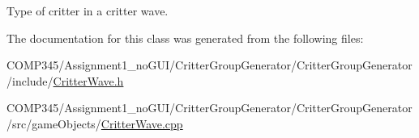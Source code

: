 Type of critter in a critter wave. 



The documentation for this class was generated from the following files\+:\begin{DoxyCompactItemize}
\item 
C\+O\+M\+P345/\+Assignment1\+\_\+no\+G\+U\+I/\+Critter\+Group\+Generator/\+Critter\+Group\+Generator/include/\hyperlink{_critter_wave_8h}{Critter\+Wave.\+h}\item 
C\+O\+M\+P345/\+Assignment1\+\_\+no\+G\+U\+I/\+Critter\+Group\+Generator/\+Critter\+Group\+Generator/src/game\+Objects/\hyperlink{_critter_wave_8cpp}{Critter\+Wave.\+cpp}\end{DoxyCompactItemize}
